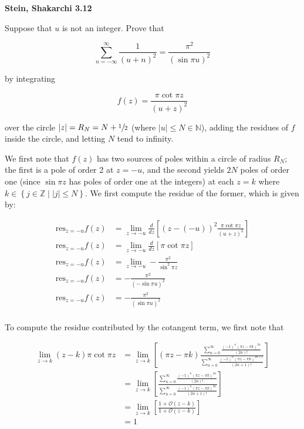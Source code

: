 \textbf{Stein, Shakarchi 3.12}

Suppose that $u$ is not an integer. Prove that

$$
\sum\limits_{n = -\infty}^{\infty} \frac{1}{(u + n)^2} = \frac{\pi^2}{(\sin{\pi u})^2}
$$

by integrating

$$
f(z) = \frac{\pi \cot{\pi z}}{(u + z)^2}
$$

over the circle $|z| = R_N = N + \sfrac{1}{2}$ (where $|u| \le N \in \mathbb{N}$), adding the residues of $f$ inside the 
circle, and letting $N$ tend to infinity.

\begin{solution}

  We first note that $f(z)$ has two sources of poles within a circle of radius $R_N$; the first is a pole of order 2 at 
  $z = -u$, and the second yields $2 N$ poles of order one (since $\sin{\pi z}$ has poles of order one at the integers) 
  at each $z = k$ where $k \in \left\{j \in \mathbb{Z} \mid |j| \le N \right\}$. We first compute the residue of the 
  former, which is given by:

  \begin{align*}
    \text{res}_{z = -u} f(z) &= \lim\limits_{z \to -u} \frac{d}{dz} \left[ (z - (-u))^2 \frac{\pi \cot{\pi z}}{(u + z)^2} \right] \\
    \text{res}_{z = -u} f(z) &= \lim\limits_{z \to -u} \frac{d}{dz} \left[ \pi \cot{\pi z}\right] \\
    \text{res}_{z = -u} f(z) &= \lim\limits_{z \to -u} -\frac{\pi^2}{\sin^2{\pi z}} \\
    \text{res}_{z = -u} f(z) &= -\frac{\pi^2}{(-\sin{\pi u})^2} \\
    \text{res}_{z = -u} f(z) &= -\frac{\pi^2}{(\sin{\pi u})^2} \\
  \end{align*}

  To compute the residue contributed by the cotangent term, we first note that 

  \begin{align*}
    \lim\limits_{z \to k} (z - k) \pi \cot{\pi z}
      &= \lim\limits_{z \to k} \left[(\pi z - \pi k) \frac{
          \sum_{n=0}^{\infty} \frac{(-1)^n (\pi z - \pi k)^{2n}}{(2n)!}
        }{
          \sum_{n=0}^{\infty} \frac{(-1)^n (\pi z - \pi k)^{2n+1}}{(2n + 1)!}
        } \right] \\
      &= \lim\limits_{z \to k} \left[
        \frac{
          \sum_{n=0}^{\infty} \frac{(-1)^n (\pi z - \pi k)^{2n}}{(2n)!}
        }{
          \sum_{n=0}^{\infty} \frac{(-1)^n (\pi z - \pi k)^{2n}}{(2n + 1)!}
        }
      \right] \\
      &= \lim\limits_{z \to k} \left[
        \frac{1 + \mathcal{O}(z - k)}{1 + \mathcal{O}(z - k)} 
      \right] \\
      &= 1
  \end{align*}
  

\end{solution}
